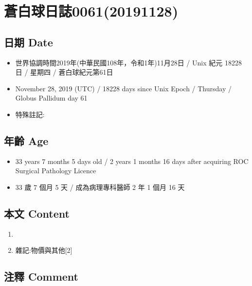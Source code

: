 \documentclass[a5paper, 12pt
]{book}
\providecommand{\tightlist}{%
  \setlength{\itemsep}{0pt}\setlength{\parskip}{0pt}}
\begin{document}
\hypertarget{ux84bcux767dux7403ux65e5ux8a8c006120191128}{%
\section{蒼白球日誌0061(20191128)}\label{ux84bcux767dux7403ux65e5ux8a8c006120191128}}

\hypertarget{ux65e5ux671f-date-60}{%
\subsection{日期 Date}\label{ux65e5ux671f-date-60}}

\begin{itemize}
\tightlist
\item
  世界協調時間2019年(中華民國108年，令和1年)11月28日 / Unix 紀元 18228
  日 / 星期四 / 蒼白球紀元第61日
\item
  November 28, 2019 (UTC) / 18228 days since Unix Epoch / Thursday /
  Globus Pallidum day 61
\item
  特殊註記:
\end{itemize}

\hypertarget{ux5e74ux9f61-age-60}{%
\subsection{年齡 Age}\label{ux5e74ux9f61-age-60}}

\begin{itemize}
\tightlist
\item
  33 years 7 months 5 days old / 2 years 1 months 16 days after
  acquiring ROC Surgical Pathology Licence
\item
  33 歲 7 個月 5 天 / 成為病理專科醫師 2 年 1 個月 16 天
\end{itemize}

\hypertarget{ux672cux6587-content-60}{%
\subsection{本文 Content}\label{ux672cux6587-content-60}}

\begin{enumerate}
\def\labelenumi{\arabic{enumi}.}
\item
\item
  雜記:物價與其他{[}2{]}
\end{enumerate}

\hypertarget{ux6ce8ux91cb-comment-54}{%
\subsection{注釋 Comment}\label{ux6ce8ux91cb-comment-54}}
\end{document}
